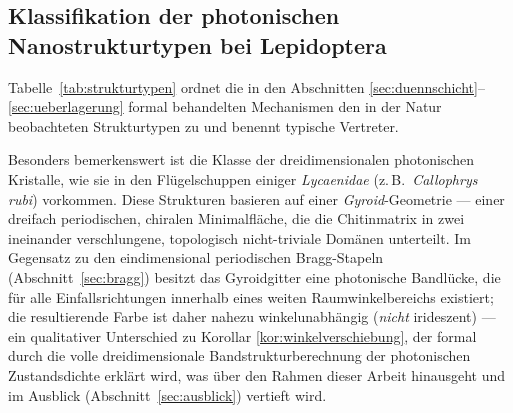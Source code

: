 ﻿\documentclass[a4paper,12pt]{article}
\theoremstyle{definition}
\begin{document}
\subsection{Klassifikation der photonischen Nanostrukturtypen bei Lepidoptera}
\label{sec:klassifikation}

Tabelle~\ref{tab:strukturtypen} ordnet die in den Abschnitten
\ref{sec:duennschicht}--\ref{sec:ueberlagerung} formal behandelten
Mechanismen den in der Natur beobachteten Strukturtypen zu und benennt
typische Vertreter.

\begin{table}[H]
	\centering
	\caption{Klassifikation photonischer Nanostrukturen in
		Schmetterlingsschuppen und ihre dominanten optischen Effekte.
		Quellen: \cite{vukusic2003photonic}, \cite{ghiradella1991light},
		\cite{vigneron2010morpho}.}
	\label{tab:strukturtypen}
\end{table}

Besonders bemerkenswert ist die Klasse der dreidimensionalen photonischen
Kristalle, wie sie in den Flügelschuppen einiger \textit{Lycaenidae} (z.\,B.\
\textit{Callophrys rubi}) vorkommen. Diese Strukturen basieren auf einer
\emph{Gyroid}-Geometrie --- einer dreifach periodischen, chiralen
Minimalfläche, die die Chitinmatrix in zwei ineinander verschlungene,
topologisch nicht-triviale Domänen unterteilt. Im Gegensatz zu den
eindimensional periodischen Bragg-Stapeln (Abschnitt~\ref{sec:bragg}) besitzt
das Gyroidgitter eine photonische Bandlücke, die für alle
Einfallsrichtungen innerhalb eines weiten Raumwinkelbereichs existiert; die
resultierende Farbe ist daher nahezu winkelunabhängig (\emph{nicht}
irideszent) --- ein qualitativer Unterschied zu Korollar
\ref{kor:winkelverschiebung}, der formal durch die volle
dreidimensionale Bandstrukturberechnung der photonischen Zustandsdichte
erklärt wird, was über den Rahmen dieser Arbeit hinausgeht und im
Ausblick (Abschnitt~\ref{sec:ausblick}) vertieft wird.
\end{document}
